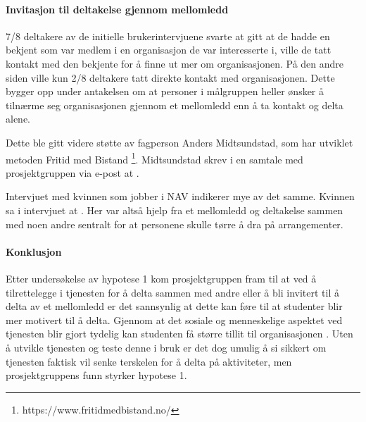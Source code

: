 \paragraph{Invitasjon til deltakelse gjennom mellomledd}
7/8 deltakere av de initielle brukerintervjuene svarte at gitt at de hadde en bekjent som var medlem i en organisasjon de var interesserte i, ville de tatt kontakt med den bekjente for å finne ut mer om organisasjonen. På den andre siden ville kun 2/8 deltakere tatt direkte kontakt med organisasjonen. Dette bygger opp under antakelsen om at personer i målgruppen heller ønsker å tilnærme seg organisasjonen gjennom et mellomledd enn å ta kontakt og delta alene. 

Dette ble gitt videre støtte av fagperson Anders Midtsundstad, som har utviklet metoden Fritid med Bistand \footnote{https://www.fritidmedbistand.no/}. Midtsundstad skrev i en samtale med prosjektgruppen via e-post at  \cite{MIDTSUNDSTAD-EPOST:14}. 

Intervjuet med kvinnen som jobber i NAV indikerer mye av det samme. Kvinnen sa i intervjuet at  \cite{NAV-INTERVJU:16}. Her var altså hjelp fra et mellomledd og deltakelse sammen med noen andre sentralt for at personene skulle tørre å dra på arrangementer. 

\paragraph{Konklusjon}
Etter undersøkelse av hypotese 1 kom prosjektgruppen fram til at ved å tilrettelegge i tjenesten for å delta sammen med andre eller å bli invitert til å delta av et mellomledd er det sannsynlig at dette kan føre til at studenter blir mer motivert til å delta. Gjennom at det sosiale og menneskelige aspektet ved tjenesten blir gjort tydelig kan studenten få større tillit til organisasjonen \cite{MIDTSUNDSTAD-EPOST:14}. Uten å utvikle tjenesten og teste denne i bruk er det dog umulig å si sikkert om tjenesten faktisk vil senke terskelen for å delta på aktiviteter, men prosjektgruppens funn styrker hypotese 1.

